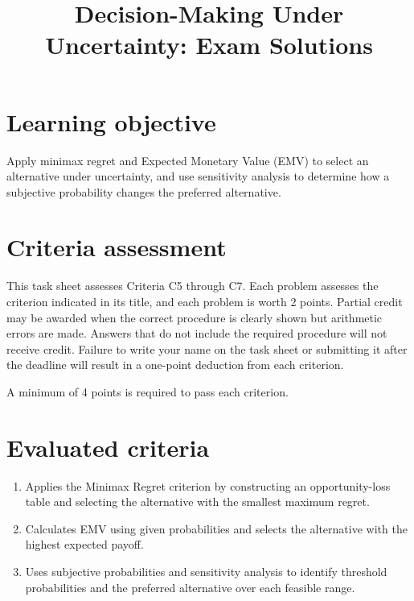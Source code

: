 \makeatletter
{}
\makeatother



\title{Decision-Making Under Uncertainty: Exam Solutions}
\author{}
\date{}


	\maketitle
	\vspace{-2cm}
	\setcounter{tocdepth}{1}
	\setcounter{secnumdepth}{2}
	\label{toc}
	\tableofcontents

	\vspace{-5mm}
	\section*{Learning objective}\vspace{-5mm}
	Apply minimax regret and Expected Monetary Value (EMV) to select an alternative under uncertainty, and use sensitivity analysis to determine how a subjective probability changes the preferred alternative.

	\section*{Criteria assessment}\vspace{-5mm}
	This task sheet assesses Criteria C5 through C7. Each problem assesses the criterion indicated in its title, and each problem is worth 2 points.
	Partial credit may be awarded when the correct procedure is clearly shown but arithmetic errors are made. Answers that do not include the required procedure will not receive credit.
	Failure to write your name on the task sheet or submitting it after the deadline will result in a one-point deduction from each criterion.

	A minimum of 4 points is required to pass each criterion.

	\section*{Evaluated criteria}
	\begin{enumerate}[label=\textbf{C\arabic*}, start=5]
		\item Applies the Minimax Regret criterion by constructing an opportunity-loss table and selecting the alternative with the smallest maximum regret.
		\item Calculates EMV using given probabilities and selects the alternative with the highest expected payoff.
		\item Uses subjective probabilities and sensitivity analysis to identify threshold probabilities and the preferred alternative over each feasible range.
	\end{enumerate}

